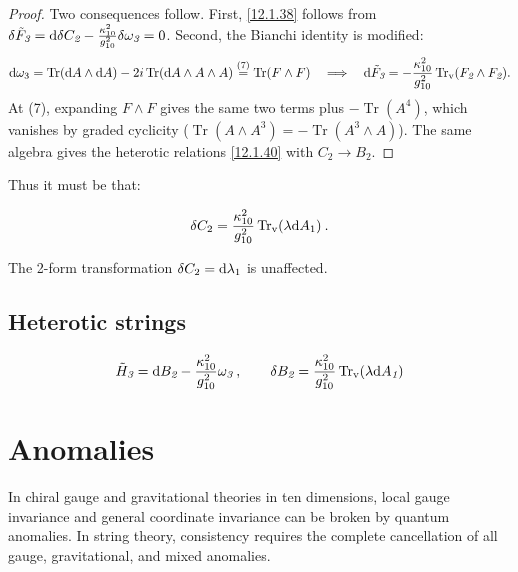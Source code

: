 \begin{tcolorbox}[breakable]
\begin{proof}
		Two consequences follow. First, \eqref{12.1.38} follows from $\delta\tilde F_{\textit{3}}=\mathrm{d}\delta C_{\textit{2}}-\frac{\kappa_{10}^{2}}{g_{10}^{2}}\delta\omega_{\textit{3}}=0$. Second, the Bianchi identity is modified:
		\begin{align*}
			\mathrm{d}\omega_{3}=\operatorname{Tr}(\mathrm{d} A\wedge\mathrm{d} A)-2i\operatorname{Tr}(\mathrm{d} A\wedge A\wedge A)
			\overset{(7)}{=} \operatorname{Tr}(F\wedge F)
			\quad\Longrightarrow\quad
			\mathrm{d}\tilde F_{\textit{3}}=-\frac{\kappa_{10}^{2}}{g_{10}^{2}}\operatorname{Tr}_{\text{v}}(F_{\textit{2}}\wedge F_{\textit{2}}) .
		\end{align*}
		At (7), expanding $F\wedge F$ gives the same two terms plus $-\operatorname{Tr}(A^{4})$, which vanishes by graded cyclicity ($\operatorname{Tr}(A\wedge A^{3})=-\operatorname{Tr}(A^{3}\wedge A)$). The same algebra gives the heterotic relations \eqref{12.1.40} with $C_{\textit{2}}\to B_{\textit{2}}$.
	\end{proof}
\end{tcolorbox}

Thus it must be that:

\begin{equation}
	\delta C_2 = \frac{\kappa_{10}^2}{g_{10}^2} \operatorname{Tr}_{\text{v}} (\lambda \mathrm{d} A_1) \:. \label{12.1.38}
\end{equation}

The 2-form transformation $\delta C_2 = \mathrm{d} \lambda_1$ is unaffected.
\subsection*{Heterotic strings}

\begin{equation}
	\tilde{H}_{\textit{3}}=\mathrm{d} B_{\textit{2}} - \frac{\kappa_{10}^{2}}{g_{10}^{2}}\omega_{\textit{3}}  \:, \qquad
	\delta B_{\textit{2}} = \frac{\kappa_{10}^{2}}{g_{10}^{2}}\operatorname{Tr}_{\mathrm{v}}(\lambda\mathrm{d} A_{\textit{1}})\label{12.1.40}
\end{equation}

\section{Anomalies}

In chiral gauge and gravitational theories in ten dimensions, local gauge invariance and general coordinate invariance can be broken by quantum anomalies. In string theory, consistency requires the complete cancellation of all gauge, gravitational, and mixed anomalies.


